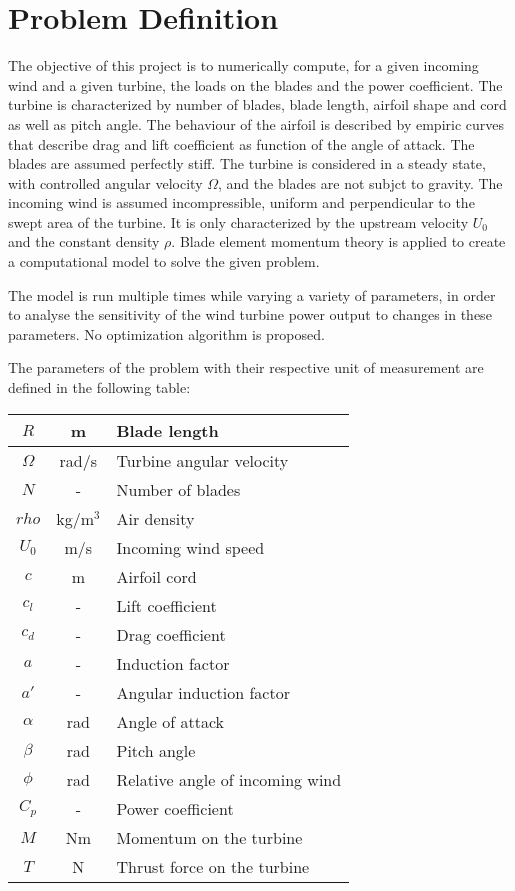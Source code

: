 \chapter{Problem Definition}

The objective of this project is to numerically compute, for a given incoming wind and a given turbine, the loads on the blades and the power coefficient. The turbine is characterized by number of blades, blade length, airfoil shape and cord as well as pitch angle. The behaviour of the airfoil is described by empiric curves that describe drag and lift coefficient as function of the angle of attack. The blades are assumed perfectly stiff. The turbine is considered in a steady state, with controlled angular velocity $\Omega$, and the blades are not subjct to gravity. The incoming wind is assumed incompressible, uniform and perpendicular to the swept area of the turbine. It is only characterized by the upstream velocity $U_0$ and the constant density $\rho$. Blade element momentum theory is applied to create a computational model to solve the given problem.

The model is run multiple times while varying a variety of parameters, in order to analyse the sensitivity of the wind turbine power output to changes in these parameters. No optimization algorithm is proposed.

The parameters of the problem with their respective unit of measurement are defined in the following table:

\begin{center}
\begin{tabular}{|c|c|l|}
	\hline
	$R$ & m & Blade length \\
	\hline
	$\Omega$ & rad/s & Turbine angular velocity \\
	\hline	
	$N$ & - & Number of blades \\
	\hline
	$rho$ & kg/m$^3$ & Air density \\
	\hline	
	$U_0$ & m/s & Incoming wind speed \\
	\hline
	$c$ & m & Airfoil cord \\
	\hline
	$c_l$ & - & Lift coefficient \\
	\hline	
	$c_d$ & - & Drag coefficient \\
	\hline	
	$a$ & - & Induction factor \\
	\hline	
	$a'$ & - & Angular induction factor \\
	\hline	
	$\alpha$ & rad & Angle of attack \\
	\hline	
	$\beta$ & rad & Pitch angle \\
	\hline	
	$\phi$ & rad & Relative angle of incoming wind \\
	\hline		
	$C_p$ & - & Power coefficient \\
	\hline		
	$M$ & Nm & Momentum on the turbine \\
	\hline		
	$T$ & N & Thrust force on the turbine \\
	\hline
\end{tabular}
\end{center}
	